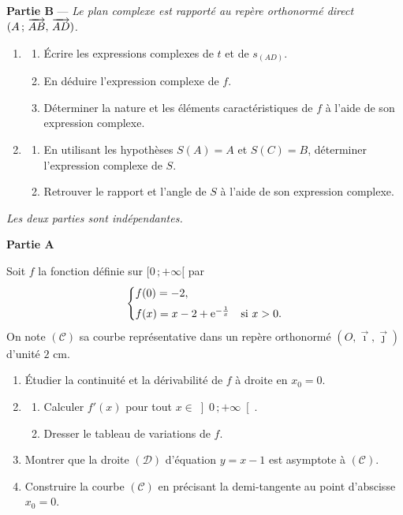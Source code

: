 \medskip
\noindent\textbf{Partie B} — \textit{Le plan complexe est rapporté au repère orthonormé direct $(A\,;\,\overrightarrow{AB},\,\overrightarrow{AD})$.}

\begin{enumerate}
	\item
	\begin{enumerate}
		\item Écrire les expressions complexes de $t$ et de $s_{(AD)}$.
		\item En déduire l'expression complexe de $f$.
		\item Déterminer la nature et les éléments caractéristiques de $f$ à l'aide de son expression complexe.
	\end{enumerate}
	\item
	\begin{enumerate}
		\item En utilisant les hypothèses $S(A) = A$ et $S(C) = B$,
		déterminer l'expression complexe de $S$.
		\item Retrouver le rapport et l'angle de $S$ à l'aide de son expression complexe.
	\end{enumerate}
\end{enumerate}




\noindent\textit{Les deux parties sont indépendantes.}

\bigskip
\noindent\textbf{Partie A}

Soit $f$ la fonction définie sur $[0\,;+\infty[$ par
$$
\begin{cases}
	f(0) = -2, \\[4pt]
	f(x) = x - 2 + \mathrm{e}^{-\frac{1}{x}} & \text{si } x > 0.
\end{cases}
$$
On note $(\mathscr{C})$ sa courbe représentative dans un repère orthonormé $(O,\vec{\imath},\vec{\jmath})$
d'unité $2$ cm.

\begin{enumerate}
	\item Étudier la continuité et la dérivabilité de $f$ à droite en $x_0 = 0$.
	\item
	\begin{enumerate}
		\item Calculer $f'(x)$ pour tout $x \in \left]0\,;+\infty\right[$.
		\item Dresser le tableau de variations de $f$.
	\end{enumerate}
	\item Montrer que la droite $(\mathscr{D})$ d'équation $y = x - 1$ est asymptote à $(\mathscr{C})$.
	\item Construire la courbe $(\mathscr{C})$ en précisant la demi-tangente au point d'abscisse $x_0 = 0$.
\end{enumerate}

